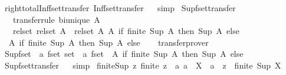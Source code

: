 \begin{isabellebody}
\ right{\isacharunderscore}total{\isacharunderscore}Inf{\isacharunderscore}fset{\isacharunderscore}transfer\ Inf{\isacharunderscore}fset{\isacharunderscore}transfer%
\isadelimproof
\ %
\endisadelimproof
%
\isatagproof
{}\isamarkupfalse%
\ simp%
\endisatagproof
{\isafoldproof}%
%
\isadelimproof
%
\endisadelimproof
\isanewline
\isanewline
{}\isamarkupfalse%
\ Sup{\isacharunderscore}fset{\isacharunderscore}transfer{\isacharcolon}\isanewline
\ \ \ {\isacharbrackleft}transfer{\isacharunderscore}rule{\isacharbrackright}{\isacharcolon}\ {\isachardoublequoteopen}bi{\isacharunderscore}unique\ A{\isachardoublequoteclose}\isanewline
\ \ \ {\isachardoublequoteopen}{\isacharparenleft}rel{\isacharunderscore}set\ {\isacharparenleft}rel{\isacharunderscore}set\ A{\isacharparenright}\ {\isacharequal}{\isacharequal}{\isacharequal}{\isachargreater}\ rel{\isacharunderscore}set\ A{\isacharparenright}\ {\isacharparenleft}{\isasymlambda}A{\isachardot}\ if\ finite\ {\isacharparenleft}Sup\ A{\isacharparenright}\ then\ Sup\ A\ else\ {\isacharbraceleft}{\isacharbraceright}{\isacharparenright}\isanewline
\ \ {\isacharparenleft}{\isasymlambda}A{\isachardot}\ if\ finite\ {\isacharparenleft}Sup\ A{\isacharparenright}\ then\ Sup\ A\ else\ {\isacharbraceleft}{\isacharbraceright}{\isacharparenright}{\isachardoublequoteclose}%
\isadelimproof
\ %
\endisadelimproof
%
\isatagproof
{}\isamarkupfalse%
\ transfer{\isacharunderscore}prover%
\endisatagproof
{\isafoldproof}%
%
\isadelimproof
%
\endisadelimproof
\isanewline
\isanewline
{}\isamarkupfalse%
\ Sup{\isacharunderscore}fset\ {\isacharcolon}{\isacharcolon}\ {\isachardoublequoteopen}{\isacharprime}a\ fset\ set\ {\isasymRightarrow}\ {\isacharprime}a\ fset{\isachardoublequoteclose}\ \ {\isachardoublequoteopen}{\isasymlambda}A{\isachardot}\ if\ finite\ {\isacharparenleft}Sup\ A{\isacharparenright}\ then\ Sup\ A\ else\ {\isacharbraceleft}{\isacharbraceright}{\isachardoublequoteclose}\isanewline
{}\ Sup{\isacharunderscore}fset{\isacharunderscore}transfer%
\isadelimproof
\ %
\endisadelimproof
%
\isatagproof
{}\isamarkupfalse%
\ simp%
\endisatagproof
{\isafoldproof}%
%
\isadelimproof
%
\endisadelimproof
\isanewline
\isanewline
{}\isamarkupfalse%
\ finite{\isacharunderscore}Sup{\isacharcolon}\ {\isachardoublequoteopen}{\isasymexists}z{\isachardot}\ finite\ z\ {\isasymand}\ {\isacharparenleft}{\isasymforall}a{\isachardot}\ a\ {\isasymin}\ X\ {\isasymlongrightarrow}\ a\ {\isasymle}\ z{\isacharparenright}\ {\isasymLongrightarrow}\ finite\ {\isacharparenleft}Sup\ X{\isacharparenright}{\isachardoublequoteclose}\isanewline

\end{isabellebody}
